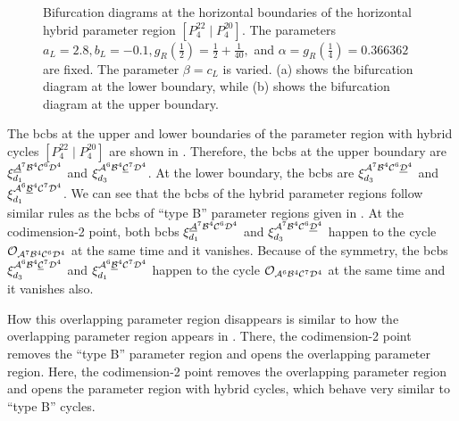 \begin{figure}
	\centering
	\caption[Bifurcation diagrams for the horizontal hybrid parameter regions in the increasing archetypal model]{
		Bifurcation diagrams at the horizontal boundaries of the horizontal hybrid parameter region $\left[P^{22}_4 \mid P^{20}_4\right]$.
		The parameters $a_L = 2.8, b_L = -0.1, g_R\left(\frac{1}{2}\right) = \frac{1}{2} + \frac{1}{40},$ and $\alpha = g_R\left(\frac{1}{4}\right) = 0.366362$ are fixed.
		The parameter $\beta = c_L$ is varied.
		(a) shows the bifurcation diagram at the lower boundary, while (b) shows the bifurcation diagram at the upper boundary.
	}
	\label{fig:add.change.appa.hor.bif}
\end{figure}

The \glspl{bcb} at the upper and lower boundaries of the parameter region with hybrid cycles $\left[P^{22}_4 \mid P^{20}_4\right]$ are shown in .
Therefore, the \glspl{bcb} at the upper boundary are $\xi_{d_1}^{\underline{\mathcal{A}}^7\mathcal{B}^4\mathcal{C}^6\mathcal{D}^4}$ and $\xi_{d_3}^{\mathcal{A}^6\mathcal{B}^4\underline{\mathcal{C}}^7\mathcal{D}^4}$.
At the lower boundary, the \glspl{bcb} are $\xi_{d_3}^{\mathcal{A}^7\mathcal{B}^4\mathcal{C}^6\underline{\mathcal{D}}^4}$ and $\xi_{d_1}^{\mathcal{A}^6\underline{\mathcal{B}}^4\mathcal{C}^7\mathcal{D}^4}$.
We can see that the \glspl{bcb} of the hybrid parameter regions follow similar rules as the \glspl{bcb} of ``type B'' parameter regions given in .
At the codimension-2 point, both \glspl{bcb} $\xi_{d_1}^{\underline{\mathcal{A}}^7\mathcal{B}^4\mathcal{C}^6\mathcal{D}^4}$ and $\xi_{d_3}^{\mathcal{A}^7\mathcal{B}^4\mathcal{C}^6\underline{\mathcal{D}}^4}$ happen to the cycle $\mathcal{O}_{\mathcal{A}^7\mathcal{B}^4\mathcal{C}^6\mathcal{D}^4}$ at the same time and it vanishes.
Because of the symmetry, the \glspl{bcb} $\xi_{d_3}^{\mathcal{A}^6\mathcal{B}^4\underline{\mathcal{C}}^7\mathcal{D}^4}$ and $\xi_{d_1}^{\mathcal{A}^6\underline{\mathcal{B}}^4\mathcal{C}^7\mathcal{D}^4}$ happen to the cycle $\mathcal{O}_{\mathcal{A}^6\mathcal{B}^4\mathcal{C}^7\mathcal{D}^4}$ at the same time and it vanishes also.

How this overlapping parameter region disappears is similar to how the overlapping parameter region appears in .
There, the codimension-2 point removes the ``type B'' parameter region and opens the overlapping parameter region.
Here, the codimension-2 point removes the overlapping parameter region and opens the parameter region with hybrid cycles, which behave very similar to ``type B'' cycles.

